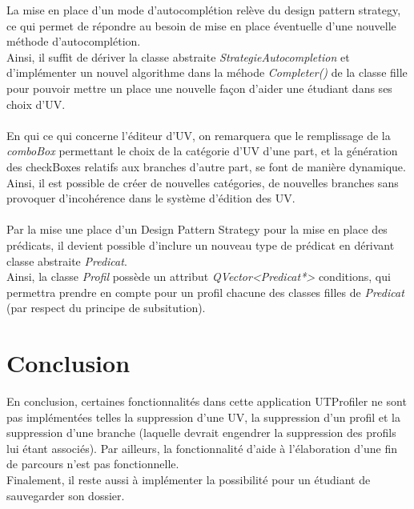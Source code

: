\documentclass[a4paper,10pt,french]{report}
\begin{document}
	La mise en place d'un mode d'autocomplétion relève du design pattern strategy, ce qui permet de répondre au besoin de mise en place éventuelle d'une nouvelle méthode d'autocomplétion.\\
	Ainsi, il suffit de dériver la classe abstraite \emph{StrategieAutocompletion} et d'implémenter un nouvel algorithme dans la méhode \emph{Completer()} de la classe fille pour pouvoir mettre un place une nouvelle façon d'aider une étudiant dans ses choix d'UV.\\\\
	
	En qui ce qui concerne l'éditeur d'UV, on remarquera que le remplissage de la \emph{comboBox} permettant le choix de la catégorie d'UV d'une part, et la génération des checkBoxes relatifs aux branches d'autre part, se font de manière dynamique. Ainsi, il est possible de créer de nouvelles catégories, de nouvelles branches sans provoquer d'incohérence dans le système d'édition des UV.\\\\
	
    Par la mise une place d'un Design Pattern Strategy pour la mise en place des prédicats, il devient possible d'inclure un nouveau type de prédicat en dérivant classe abstraite \emph{Predicat}.\\
    Ainsi, la classe \emph{Profil} possède un attribut \emph{QVector<Predicat*>} conditions, qui permettra prendre en compte pour un profil chacune des classes filles de \emph{Predicat} (par respect du principe de subsitution).
    
	
	
	
	
	
\newpage			
\section*{Conclusion}\label{sec:Conclusion}

En conclusion, certaines fonctionnalités dans cette application UTProfiler ne sont pas implémentées telles la suppression d'une UV, la suppression d'un profil et la suppression d'une branche (laquelle devrait engendrer la suppression des profils lui étant associés).
Par ailleurs, la fonctionnalité d'aide à l'élaboration d'une fin de parcours n'est pas fonctionnelle.\\
Finalement, il reste aussi à implémenter la possibilité pour un étudiant de sauvegarder son dossier.





%
%

\end{document}
